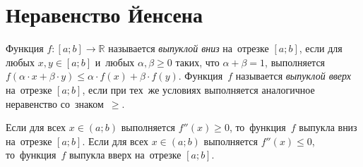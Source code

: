 
\section*{Неравенство Йенсена}


\begingroup \def\piconst{\mathrm{\pi}}

Функция $f \colon [a; b] \to \mathbb{R}$ называется \emph{выпуклой вниз}
на~отрезке $[a; b]$, если для любых $x, y \in [a; b]$ и~любых
$\alpha, \beta \geq 0$ таких, что $\alpha + \beta = 1$, выполняется
\(
    f(\alpha \cdot x + \beta \cdot y)
\leq
    \alpha \cdot f(x)+ \beta \cdot f(y)
\).
Функция~$f$ называется \emph{выпуклой вверх} на~отрезке $[a; b]$, если при
тех~же условиях выполняется аналогичное неравенство со~знаком~$\geq$.

\theorem
Если для всех $x \in (a; b)$ выполняется $f''(x) \geq 0$, то~функция~$f$
выпукла вниз на~отрезке $[a; b]$.
Если для всех $x \in (a; b)$ выполняется $f''(x) \leq 0$, то~функция~$f$
выпукла вверх на~отрезке $[a; b]$.

